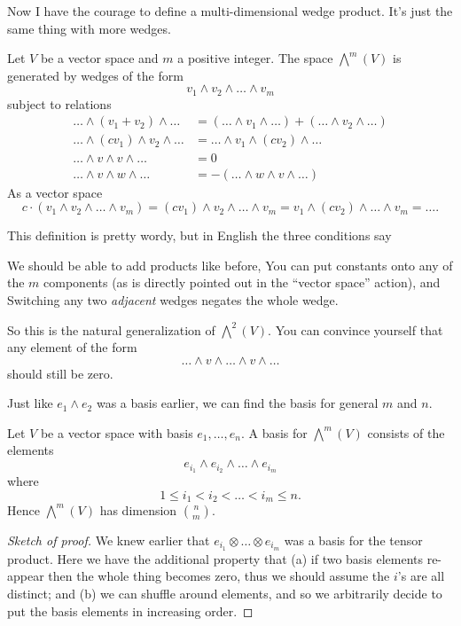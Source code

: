 Now I have the courage to define a multi-dimensional wedge product.
It's just the same thing with more wedges.
\begin{definition}
	Let $V$ be a vector space and $m$ a positive integer.
	The space $\bigwedge^m(V)$ is generated by wedges of the form
	\[ v_1 \wedge v_2 \wedge \dots \wedge v_m \]
	subject to relations
	\begin{align*}
		\dots \wedge (v_1+v_2) \wedge \dots
			&= (\dots \wedge v_1 \wedge \dots)
			 + (\dots \wedge v_2 \wedge \dots) \\
		\dots \wedge (cv_1) \wedge v_2 \wedge \dots
			&= \dots \wedge v_1 \wedge (cv_2) \wedge \dots  \\
		\dots \wedge v \wedge v \wedge \dots &= 0 \\
		\dots \wedge v \wedge w \wedge \dots &=
			- (\dots \wedge w \wedge v \wedge \dots)
	\end{align*}
	As a vector space
	\[ c \cdot (v_1 \wedge v_2 \wedge \dots \wedge v_m)
	 = (cv_1) \wedge v_2 \wedge \dots \wedge v_m
	 = v_1 \wedge (cv_2) \wedge \dots \wedge v_m
	 = \dots .
	\]
\end{definition}
This definition is pretty wordy, but in English the three conditions say
\begin{itemize}
	\ii We should be able to add products like before,
	\ii You can put constants onto any of the $m$ components
	(as is directly pointed out in the ``vector space'' action), and
	\ii Switching any two \emph{adjacent} wedges negates the whole wedge.
\end{itemize}
So this is the natural generalization of $\bigwedge^2(V)$.
You can convince yourself that any element of the form
\[ \dots \wedge v \wedge \dots \wedge v \wedge \dots \]
should still be zero.

Just like $e_1 \wedge e_2$ was a basis earlier, we can find the basis
for general $m$ and $n$.
\begin{proposition}
	Let $V$ be a vector space with basis $e_1, \dots, e_n$.
	A basis for $\bigwedge^m(V)$ consists of the elements
	\[ e_{i_1} \wedge e_{i_2} \wedge \dots \wedge e_{i_m} \]
	where
	\[ 1 \le i_1 < i_2 < \dots < i_m \le n. \]
	Hence $\bigwedge^m(V)$ has dimension $\binom nm$.
\end{proposition}
\begin{proof}[Sketch of proof]
	We knew earlier that $e_{i_1} \otimes \dots \otimes e_{i_m}$
	was a basis for the tensor product.
	Here we have the additional property that (a)
	if two basis elements re-appear then the whole thing becomes zero,
	thus we should assume the $i$'s are all distinct;
	and (b) we can shuffle around elements,
	and so we arbitrarily decide to put the basis elements
	in increasing order.
\end{proof}


